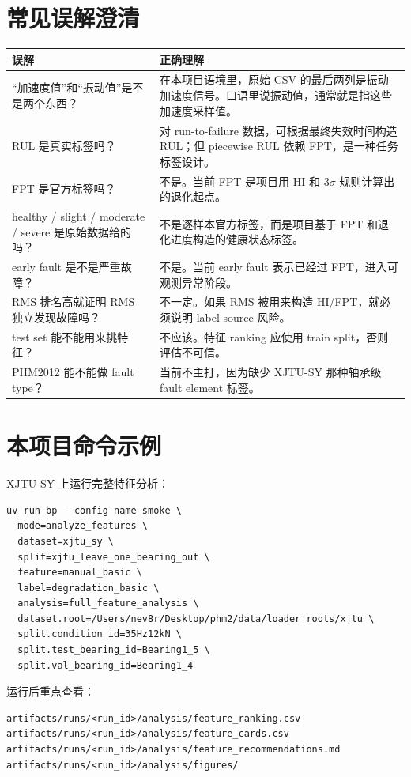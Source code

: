 \documentclass[UTF8,11pt]{ctexart}
\begin{document}
\section{常见误解澄清}

\begin{longtable}{L{5cm}L{9.2cm}}
\toprule
误解 & 正确理解 \\
\midrule
\endhead
“加速度值”和“振动值”是不是两个东西？ & 在本项目语境里，原始 CSV 的最后两列是振动加速度信号。口语里说振动值，通常就是指这些加速度采样值。 \\
RUL 是真实标签吗？ & 对 run-to-failure 数据，可根据最终失效时间构造 RUL；但 piecewise RUL 依赖 FPT，是一种任务标签设计。 \\
FPT 是官方标签吗？ & 不是。当前 FPT 是项目用 HI 和 3$\sigma$ 规则计算出的退化起点。 \\
healthy / slight / moderate / severe 是原始数据给的吗？ & 不是逐样本官方标签，而是项目基于 FPT 和退化进度构造的健康状态标签。 \\
early fault 是不是严重故障？ & 不是。当前 early fault 表示已经过 FPT，进入可观测异常阶段。 \\
RMS 排名高就证明 RMS 独立发现故障吗？ & 不一定。如果 RMS 被用来构造 HI/FPT，就必须说明 label-source 风险。 \\
test set 能不能用来挑特征？ & 不应该。特征 ranking 应使用 train split，否则评估不可信。 \\
PHM2012 能不能做 fault type？ & 当前不主打，因为缺少 XJTU-SY 那种轴承级 fault element 标签。 \\
\bottomrule
\end{longtable}

\section{本项目命令示例}

XJTU-SY 上运行完整特征分析：
\begin{verbatim}
uv run bp --config-name smoke \
  mode=analyze_features \
  dataset=xjtu_sy \
  split=xjtu_leave_one_bearing_out \
  feature=manual_basic \
  label=degradation_basic \
  analysis=full_feature_analysis \
  dataset.root=/Users/nev8r/Desktop/phm2/data/loader_roots/xjtu \
  split.condition_id=35Hz12kN \
  split.test_bearing_id=Bearing1_5 \
  split.val_bearing_id=Bearing1_4
\end{verbatim}

运行后重点查看：
\begin{verbatim}
artifacts/runs/<run_id>/analysis/feature_ranking.csv
artifacts/runs/<run_id>/analysis/feature_cards.csv
artifacts/runs/<run_id>/analysis/feature_recommendations.md
artifacts/runs/<run_id>/analysis/figures/
\end{verbatim}
\end{document}
